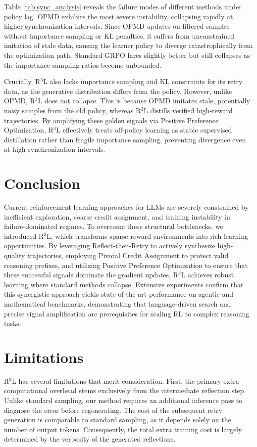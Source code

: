 \documentclass[11pt]{article}
\begin{document}


Table \ref{tab:sync_analysis} reveals the failure modes of different methods under policy lag. OPMD exhibits the most severe instability, collapsing rapidly at higher synchronization intervals. Since OPMD updates on filtered samples without importance sampling or KL penalties, it suffers from unconstrained imitation of stale data, causing the learner policy to diverge catastrophically from the optimization path. Standard GRPO fares slightly better but still collapses as the importance sampling ratios become unbounded.

Crucially, R$^3$L also lacks importance sampling and KL constraints for its retry data, as the generative distribution differs from the policy. However, unlike OPMD, R$^3$L does not collapse. This is because OPMD imitates stale, potentially noisy samples from the old policy, whereas R$^3$L distills verified high-reward trajectories. By amplifying these golden signals via Positive Preference Optimization, R$^3$L effectively treats off-policy learning as stable supervised distillation rather than fragile importance sampling, preventing divergence even at high synchronization intervals.


\section{Conclusion}
Current reinforcement learning approaches for LLMs are severely constrained by inefficient exploration, coarse credit assignment, and training instability in failure-dominated regimes. To overcome these structural bottlenecks, we introduced R$^3$L, which transforms sparse-reward environments into rich learning opportunities. By leveraging Reflect-then-Retry to actively synthesize high-quality trajectories, employing Pivotal Credit Assignment to protect valid reasoning prefixes, and utilizing Positive Preference Optimization to ensure that these successful signals dominate the gradient updates, R$^3$L achieves robust learning where standard methods collapse. Extensive experiments confirm that this synergistic approach yields state-of-the-art performance on agentic and mathematical benchmarks, demonstrating that language-driven search and precise signal amplification are prerequisites for scaling RL to complex reasoning tasks.

\section*{Limitations}
R$^3$L has several limitations that merit consideration. First, the primary extra computational overhead stems exclusively from the intermediate reflection step. Unlike standard sampling, our method requires an additional inference pass to diagnose the error before regenerating. The cost of the subsequent retry generation is comparable to standard sampling, as it depends solely on the number of output tokens. Consequently, the total extra training cost is largely determined by the verbosity of the generated reflections.
\end{document}
